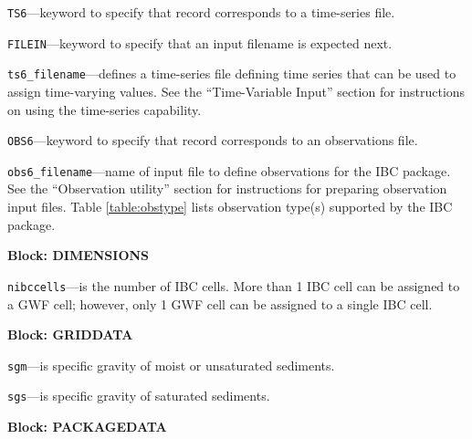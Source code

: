 \begin{description}
\item \texttt{TS6}---keyword to specify that record corresponds to a time-series file.

\item \texttt{FILEIN}---keyword to specify that an input filename is expected next.

\item \texttt{ts6\_filename}---defines a time-series file defining time series that can be used to assign time-varying values. See the ``Time-Variable Input'' section for instructions on using the time-series capability.

\item \texttt{OBS6}---keyword to specify that record corresponds to an observations file.

\item \texttt{obs6\_filename}---name of input file to define observations for the IBC package. See the ``Observation utility'' section for instructions for preparing observation input files. Table \ref{table:obstype} lists observation type(s) supported by the IBC package.

\end{description}
\item \textbf{Block: DIMENSIONS}

\begin{description}
\item \texttt{nibccells}---is the number of IBC cells.  More than 1 IBC cell can be assigned to a GWF cell; however, only 1 GWF cell can be assigned to a single IBC cell.

\end{description}
\item \textbf{Block: GRIDDATA}

\begin{description}
\item \texttt{sgm}---is specific gravity of moist or unsaturated sediments.

\item \texttt{sgs}---is specific gravity of saturated sediments.

\end{description}
\item \textbf{Block: PACKAGEDATA}

